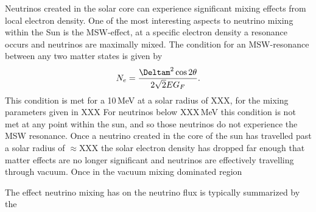 Neutrinos created in the solar core can experience significant mixing effects from local
electron density.
One of the most interesting aspects to neutrino mixing within the Sun is the MSW-effect,
at a specific electron density a resonance occurs and neutrinos are maximally mixed.
The condition for an MSW-resonance between any two matter states is given by
\begin{equation}
    N_{e} = \frac{\Deltam^{2} \cos2\theta}{2\sqrt{2}EG_{F}}\text{.}
\end{equation}
This condition is met for a 10\,MeV at a solar radius of XXX, for the mixing parameters
given in XXX %
For neutrinos below XXX\,MeV this condition is not met at any point within the sun,
and so those neutrinos do not experience the MSW resonance.
Once a neutrino created in the core of the sun has travelled past a solar radius of $\approx$XXX
the solar electron density has dropped far enough that matter effects are no longer significant
and neutrinos are effectively travelling through vacuum. Once in the vacuum mixing dominated region

The effect neutrino mixing has on the neutrino flux is typically summarized by the
